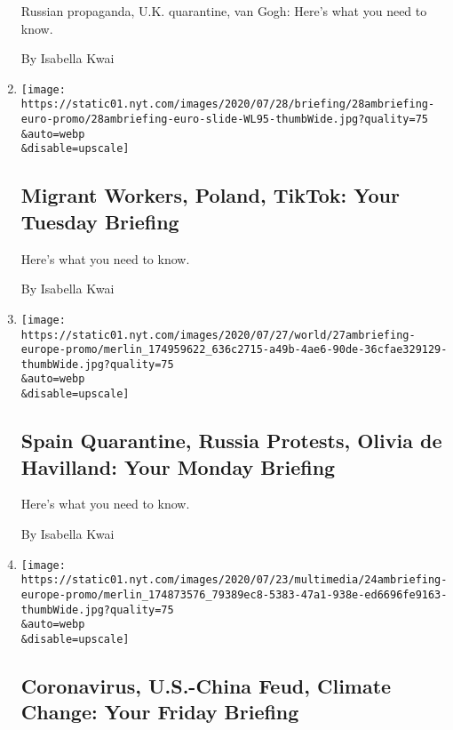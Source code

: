 \begin{enumerate}
  Russian propaganda, U.K. quarantine, van Gogh: Here's what you need to
  know.

  By Isabella Kwai
\item
  \href{/2020/07/28/briefing/migrant-workers-poland-tiktok.html}{}

  \texttt{[image: https://static01.nyt.com/images/2020/07/28/briefing/28ambriefing-euro-promo/28ambriefing-euro-slide-WL95-thumbWide.jpg?quality=75\\\&auto=webp\\\&disable=upscale]}

  \hypertarget{migrant-workers-poland-tiktok-your-tuesday-briefing}{%
  \subsection{Migrant Workers, Poland, TikTok: Your Tuesday
  Briefing}\label{migrant-workers-poland-tiktok-your-tuesday-briefing}}

  Here's what you need to know.

  By Isabella Kwai
\item
  \href{/2020/07/27/briefing/spain-quarantine-russia-protests-olivia-de-havilland.html}{}

  \texttt{[image: https://static01.nyt.com/images/2020/07/27/world/27ambriefing-europe-promo/merlin\_174959622\_636c2715-a49b-4ae6-90de-36cfae329129-thumbWide.jpg?quality=75\\\&auto=webp\\\&disable=upscale]}

  \hypertarget{spain-quarantine-russia-protests-olivia-de-havilland-your-monday-briefing}{%
  \subsection{Spain Quarantine, Russia Protests, Olivia de Havilland:
  Your Monday
  Briefing}\label{spain-quarantine-russia-protests-olivia-de-havilland-your-monday-briefing}}

  Here's what you need to know.

  By Isabella Kwai
\item
  \href{/2020/07/24/briefing/coronavirus-america-china-consulates-climate-change.html}{}

  \texttt{[image: https://static01.nyt.com/images/2020/07/23/multimedia/24ambriefing-europe-promo/merlin\_174873576\_79389ec8-5383-47a1-938e-ed6696fe9163-thumbWide.jpg?quality=75\\\&auto=webp\\\&disable=upscale]}

  \hypertarget{coronavirus-us-china-feud-climate-change-your-friday-briefing}{%
  \subsection{Coronavirus, U.S.-China Feud, Climate Change: Your Friday
  Briefing}\label{coronavirus-us-china-feud-climate-change-your-friday-briefing}}


\end{enumerate}
